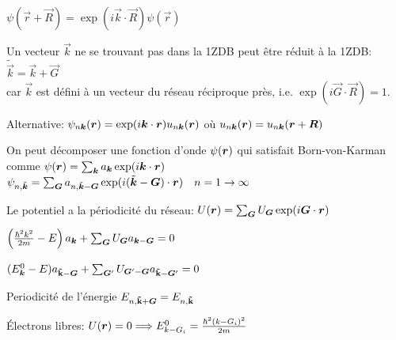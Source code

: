 \columnbreak

\begin{squishlist}
    \item $\psi(\vec{r} + \vec{R}) = \exp(i\vec{k} \cdot \vec{R}) \psi(\vec{r})$
    \item Un vecteur $\vec{k}$ ne se trouvant pas dans la 1ZDB peut être réduit à la 1ZDB: $\tilde{\vec{k}} = \vec{k} + \vec{G}$ \\
    car $\vec{k}$ est défini à un vecteur du réseau réciproque près, i.e. $\exp(i \vec{G}\cdot \vec{R}) = 1$.
    \item Alternative: $\psi_{n \bm{k}}(\bm{r}) = \exp(i \bm{k} \cdot \bm{r} ) u_{n \bm{k}}(\bm{r})$ où $u_{n \bm{k}}(\bm{r}) =  u_{n \bm{k}}(\bm{r}+ \bm{R})$
\end{squishlist}

\begin{squishlist}
    \item On peut décomposer une fonction d'onde $\psi(\bm{r})$ qui satisfait Born-von-Karman comme $\psi(\bm{r}) = \sum_{\bm{k}} a_{\bm{k}} \exp(i \bm{k} \cdot \bm{r})$
    \squishsep $\psi_{n,\tilde{\bm{k}}} = \sum_{\bm{G}} a_{n, \tilde{\bm{k}}-\bm{G}} \exp(i (\tilde{\bm{k}} - \bm{G}) \cdot \bm{r}) \quad n=1\rightarrow\infty$
    \item Le potentiel a la périodicité du réseau: $U(\bm{r}) = \sum_{\bm{G}} U_{\bm{G}} \exp(i \bm{G} \cdot \bm{r})$
    \item $\left(\frac{\hbar^2 k^2}{2m} - E\right)a_{\bm{k}} + \sum_{\bm{G}}U_{\bm{G}}a_{\bm{k} - \bm{G}}  = 0$
    \item $(E_{\bm{k}}^0 - E)a_{\mathbf{{\tilde{k}}} - \bm{G}} + \sum_{\bm{G}'}U_{\bm{G}' - \bm{G}}a_{\mathbf{\tilde{k}} - \bm{G}'}  = 0$
    \item Periodicité de l'énergie $ E_{n,\mathbf{\tilde{k}} + \bm{G}} = E_{n,\mathbf{\tilde{k}}}$
    \item Électrons libres: $U(\bm{r}) = 0 \Longrightarrow E_{k - G_i}^0 = \frac{\hbar^2(k - G_i)^2}{2m}$
\end{squishlist}

